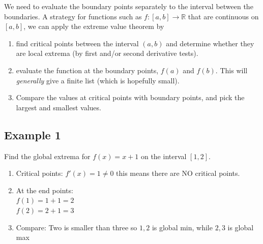 We need to evaluate the boundary points separately to the interval between the
boundaries. A strategy for functions such as $f:[a,b] \to \mathbb{R}$ that are
continuous on $[a,b]$, we can apply the extreme value theorem by
\begin{enumerate}
  \item find critical points between the interval $(a,b)$ and determine whether
  they are local extrema (by first and/or second derivative tests).
  \item evaluate the function at the boundary points, $f(a)$ and $f(b)$. This
  will \emph{generally} give a finite list (which is hopefully small).
  \item Compare the values at critical points with boundary points, and pick the
  largest and smallest values.
\end{enumerate}

\subsection{Example 1}
Find the global extrema for $f(x) = x+1$ on the interval $[1,2]$.
\begin{enumerate}
  \item Critical points:
  $f'(x) = 1 \neq 0$ this means there are NO critical points.
  \item At the end points: \\
  $f(1) = 1 + 1 = 2$ \\
  $f(2) = 2 + 1 = 3$ \\
  \item Compare:
  Two is smaller than three so $1,2$ is global min, while $2,3$ is global max
\end{enumerate}

